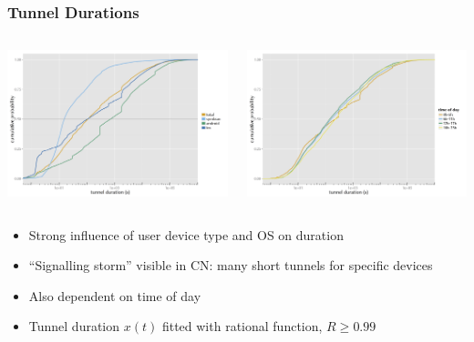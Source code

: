 \documentclass{beamer}
\begin{document}
\begin{frame}
	\frametitle{Tunnel Durations}

	\begin{columns}[T]
			\includegraphics[width=\columnwidth]{extras/R-tunnel-duration-operating-system.png}

			\includegraphics[width=\columnwidth]{extras/R-duration-timeofday-ecdf.png}
	\end{columns}

	\begin{itemize}
		\item Strong influence of user device type and OS on duration
		\item ``Signalling storm'' visible in CN: many short tunnels for specific devices
		\item Also dependent on time of day
		\item Tunnel duration $x(t)$ fitted with rational function, $R \geq 0.99$
	\end{itemize}
\end{frame}
\end{document}
